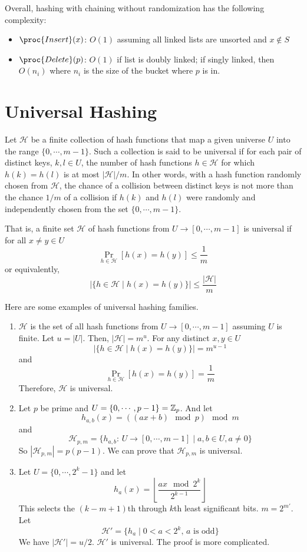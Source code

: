 Overall, hashing with chaining without randomization has the following complexity:
\begin{itemize}
    \item $\proc{Insert}(x)$: $O(1)$ assuming all linked lists are unsorted and $x \not\in S$
    \item $\proc{Delete}(p)$: $O(1)$ if list is doubly linked; if singly linked, then $O(n_i)$ where $n_i$ is the size of the bucket where $p$ is in.
\end{itemize}

\section{Universal Hashing}

Let $\mathcal{H}$ be a finite collection of hash functions that map a given universe $U$ into the range $\{0,\cdots,m-1\}$. Such a collection is said to be universal if for each pair of distinct keys, $k,l \in U$, the number of hash functions $h \in \mathcal{H}$ for which $h(k) = h(l)$ is at most $|\mathcal{H}|/m$. In other words, with a hash function randomly chosen from $\mathcal{H}$, the chance of a collision between distinct keys is not more than the chance $1/m$ of a collision if $h(k)$ and $h(l)$ were randomly and independently chosen from the set $\{0,\cdots,m-1\}$.

That is, a finite set $\mathcal{H}$ of hash functions from $U \to [0,\cdots,m-1]$ is universal if for all $x \neq y \in U$
$$
\Pr_{h \in \mathcal{H}} [h(x) = h(y)] \leq \frac{1}{m}
$$
or equivalently,
$$
\left| \{ h \in \mathcal{H} \mid h(x) = h(y) \} \right| \leq \frac{|\mathcal{H}|}{m}
$$

Here are some examples of universal hashing families.

\begin{enumerate}
    \item $\mathcal{H}$ is the set of all hash functions from $U \to [0,\cdots,m-1]$ assuming $U$ is finite. Let $u = |U|$. Then, $|\mathcal{H}|=m^u$. For any distinct $x,y\in U$
    $$
    \left| \{ h \in \mathcal{H} \mid h(x) = h(y) \} \right| = m^{u-1}
    $$
    and
    $$
    \Pr_{h \in \mathcal{H}} [h(x) = h(y)] = \frac{1}{m}
    $$
    Therefore, $\mathcal{H}$ is universal.

    \item Let $p$ be prime and $U = \{0,\cdots,p-1\} = \mathbb{Z}_p$. And let
    $$
    h_{a,b}(x) = ((ax+b) \mod p) \mod m
    $$
    and
    $$
    \mathcal{H}_{p,m} = \{h_{a,b}:\, U \to [0,\cdots,m-1] \mid a,b \in U, a \neq 0 \}
    $$
    So $|\mathcal{H}_{p,m}| = p(p-1)$. We can prove that $\mathcal{H}_{p,m}$ is universal.

    \item Let $U = \{0, \cdots, 2^k-1\}$ and let
    $$
    h_a(x) = \left\lfloor \frac{ax \mod 2^k}{2^{k-1}} \right\rfloor
    $$
    This selects the $(k-m+1)$th through $k$th least significant bits. $m=2^{m'}$. Let
    $$
    \mathcal{H}' = \{ h_a \mid 0 < a < 2^k,\, \text{$a$ is odd}\}
    $$
    We have $|\mathcal{H}'| = u/2$. $\mathcal{H}'$ is universal. The proof is more complicated.
\end{enumerate}

